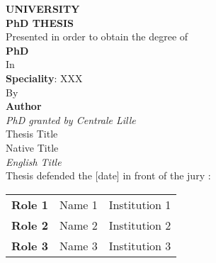 \documentclass[11pt,fleqn,openany]{book} %
\begin{document}

\dominitoc
\doparttoc


\begin{titlepage}
    \begin{center}
        {\Huge\textbf{UNIVERSITY}} \\
        \vspace{0.5cm}
        \Large\textbf{PhD THESIS} \\
        \vspace{0.5cm}
        \large{Presented in order to obtain the degree of} \\
        \vspace{0.5cm}
        \Huge\textbf{PhD} \\
        \vspace{0.5cm}
        \Large{In} \\
        \vspace{0.5cm}
        \large{\textbf{Speciality}: XXX} \\
        \vspace{0.5cm}
        \Large{By} \\
        \vspace{0.5cm}
        \Huge\textbf{Author} \\
        \vspace{0.5cm}
        \large{\textit{PhD granted by Centrale Lille}} \\
        \vspace{0.5cm}
        \large{Thesis Title} \\
        \vspace{0.1cm}
        \Large{Native Title} \\
        \vspace{0.1cm}
        \Large{\textit{English Title}} \\
        \vspace{0.4cm}
        \large{Thesis defended the [date] in front of the jury :} \\
        \vspace{0.5cm}
        \hspace*{0.2cm}
        \begin{tabular}{lll}
            \large{\textbf{Role 1}} & \large{Name 1} & Institution 1\\
            \large{\textbf{Role 2}} & \large{Name 2} & Institution 2\\
            \large{\textbf{Role 3}} & \large{Name 3} & Institution 3\\

\end{tabular}
\end{center}
\end{titlepage}
\end{document}

